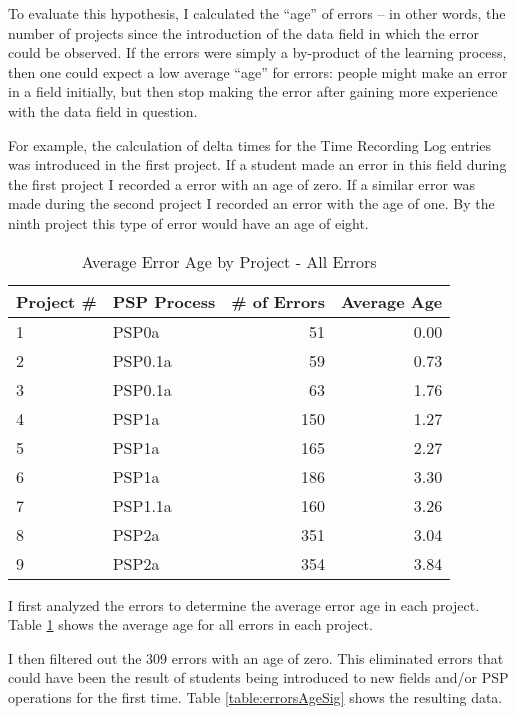 To evaluate this hypothesis, I calculated the ``age'' of errors -- in other
words, the number of projects since the introduction of the data field in
which the error could be observed.  If the errors were simply a by-product
of the learning process, then one could expect a low average ``age'' for
errors: people might make an error in a field initially, but then stop
making the error after gaining more experience with the data field in
question.

For example, the calculation of delta times for the Time Recording Log
entries was introduced in the first project.  If a student made an error in
this field during the first project I recorded a error with an age of zero.
If a similar error was made during the second project I recorded an error
with the age of one.  By the ninth project this type of error would have an
age of eight.

\begin{table} [bht] 
\begin{center}
\caption{\label{table:errorsAgeAll} 
Average Error Age by Project - All Errors}
\begin{tabular}{|l|l|r|r|}\hline 
Project \# & PSP Process & \# of Errors & Average Age \\ \hline\hline 
1 & PSP0a   &  51  &  0.00 \\ \hline
2 & PSP0.1a &  59  &  0.73 \\ \hline
3 & PSP0.1a &  63  &  1.76 \\ \hline
4 & PSP1a   & 150  &  1.27 \\ \hline
5 & PSP1a   & 165  &  2.27 \\ \hline
6 & PSP1a   & 186  &  3.30 \\ \hline
7 & PSP1.1a & 160  &  3.26 \\ \hline
8 & PSP2a   & 351  &  3.04 \\ \hline
9 & PSP2a   & 354  &  3.84 \\ \hline
\end{tabular}
\end{center}
\end{table}

I first analyzed the errors to determine the average error age in each
project.  Table \ref{table:errorsAgeAll} shows the average age for all errors
in each project.

I then filtered out the 309 errors with an age of zero.  This eliminated
errors that could have been the result of students being introduced to new
fields and/or PSP operations for the first time. Table
\ref{table:errorsAgeSig} shows the resulting data.

